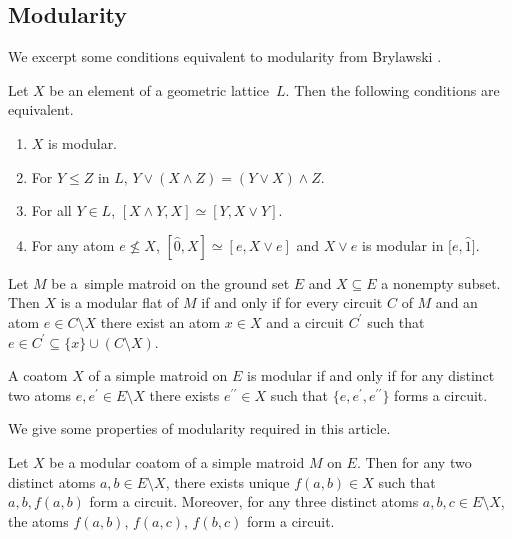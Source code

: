\subsection{Modularity}

We excerpt some conditions equivalent to modularity from Brylawski \cite{brylawski1975modular-totams}.
\begin{Proposition}\label{brylawski modular equivalent}
Let $ X $ be an element of a geometric lattice~$ L $.
Then the following conditions are equivalent.
\begin{enumerate}[$(1)$]\itemsep=0pt
\item $ X $ is modular.
\item\label{brylawski modular equivalent 2} For $ Y \leq Z $ in $ L $, $ Y \vee (X \wedge Z) = (Y \vee X) \wedge Z $.
\item\label{brylawski modular equivalent 3} For all $ Y \in L $, $ [X \wedge Y, X] \simeq [Y, X \vee Y] $.
\item\label{brylawski modular equivalent 4} For any atom $ e \not\leq X $, $ [\hat{0}, X] \simeq [e, X \vee e] $ and $ X \vee e $ is modular in $ \big[e, \hat{1}\big] $.
\end{enumerate}
\end{Proposition}


\begin{Theorem}\label{Brylawsky modular short-circuit axiom}
Let $ M $ be a~simple matroid on the ground set $ E $ and $ X \subseteq E $ a nonempty subset.
Then $ X $ is a modular flat of $ M $ if and only if for every circuit $ C $ of $ M $ and an atom $ e \in C \setminus X $ there exist an atom $ x \in X $ and a circuit $ C^{\prime} $ such that $ e \in C^{\prime} \subseteq \{x\} \cup (C \setminus X) $.
\end{Theorem}

\begin{Theorem}\label{Brylawski modular coatom}
A coatom $ X $ of a simple matroid on $ E $ is modular if and only if for any distinct two atoms $ e, e^{\prime} \in E\setminus X $ there exists $ e^{\prime\prime} \in X $ such that $ \{e,e^{\prime},e^{\prime\prime}\} $ forms a circuit.
\end{Theorem}

We give some properties of modularity required in this article.
\begin{Proposition}\label{Jambu-Papadima}
Let $ X $ be a modular coatom of a simple matroid $ M $ on $ E $. Then for any two distinct atoms $a,b \in E\setminus X $, there exists unique $ f(a,b) \in X $ such that $ a,b,f(a,b) $ form a circuit.
Moreover, for any three distinct atoms $ a,b,c \in E\setminus X $, the atoms $ f(a,b)$, $f(a,c)$, $f(b,c) $ form a circuit.
\end{Proposition}

